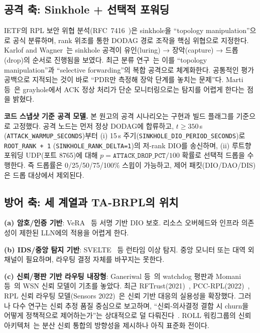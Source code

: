 \documentclass[12pt,a4paper]{article}
\begin{document}
\subsection{공격 축: Sinkhole + 선택적 포워딩}

IETF의 RPL 보안 위협 분석(RFC~7416~\cite{rfc7416})은
sinkhole을 ``topology manipulation''으로 공식 분류하며,
rank 위조를 통한 DODAG 경로 조작을 핵심 위협으로 지정한다.
Karlof and Wagner~\cite{karlof2003}는 sinkhole 공격이
유인(luring) → 장악(capture) → 드롭(drop)의 순서로 진행됨을 보였다.
최근 분류 연구~\cite{secrpl}는 이를 ``topology manipulation''과
``selective forwarding''의 복합 공격으로 체계화한다.
공통적인 평가 공백으로 지적되는 것이 바로
``PDR만 측정해 장악 단계를 놓치는 문제''다.
Marti 등~\cite{marti2000}은 grayhole에서 ACK 정상 처리가
단순 모니터링으로는 탐지를 어렵게 한다는 점을 밝혔다.

\medskip
\noindent\textbf{코드 스냅샷 기준 공격 모델.}
본 원고의 공격 시나리오는
 구현과
 빌드 플래그를 기준으로 고정했다.
공격 노드는 먼저 정상 DODAG에 합류하고,
$t \ge 350$\,s (\texttt{ATTACK\_WARMUP\_SECONDS})부터
(i) 15\,s 주기(\texttt{SINKHOLE\_DIO\_PERIOD\_SECONDS})로
\texttt{ROOT\_RANK + 1} (\texttt{SINKHOLE\_RANK\_DELTA=1})의 저-rank DIO를 송신하며,
(ii) 루트향 포워딩 UDP(포트 8765)에 대해
$p=\texttt{ATTACK\_DROP\_PCT}/100$ 확률로 선택적 드롭을 수행한다.
즉 드롭률은 0/25/50/75/100\% 스윕이 가능하고,
제어 패킷(DIO/DAO/DIS)은 드롭 대상에서 제외된다.

\subsection{방어 축: 세 계열과 TA-BRPL의 위치}

\textbf{(a) 암호/인증 기반}: VeRA~\cite{dvir2011} 등 서명 기반 DIO 보호.
리소스 오버헤드와 인프라 의존성이 제한된 LLN에의 적용을 어렵게 한다.

\textbf{(b) IDS/중앙 탐지 기반}: SVELTE~\cite{raza2013} 등
런타임 이상 탐지. 중앙 모니터 또는 대역 외 채널이 필요하며,
라우팅 결정 자체를 바꾸지는 못한다.

\textbf{(c) 신뢰/평판 기반 라우팅 내장형}:
Ganeriwal 등~\cite{airtime_trust}의 watchdog 평판과
Momani 등~\cite{Momani2010}의 WSN 신뢰 모델이 기초를 놓았다.
최근 RFTrust(2021)~\cite{rftrust2021},
PCC-RPL(2022)~\cite{pccrpl2022},
RPL 신뢰 라우팅 모델(Sensors 2022)~\cite{trustmodel2022}은
신뢰 기반 대응의 실용성을 확장했다.
그러나 다수 연구는 신뢰 추정 품질 중심으로 보고하며,
``신뢰-의사결정 결합 시 churn을 어떻게 정책적으로 제어하는가''는
상대적으로 덜 다뤄진다~\cite{sinkhole_survey2023,rpl_survey2025}.
ROLL 워킹그룹의 신뢰 아키텍처~\cite{roll_trust}는
분산 신뢰 통합의 방향성을 제시하나 아직 표준화 전이다.
\end{document}
